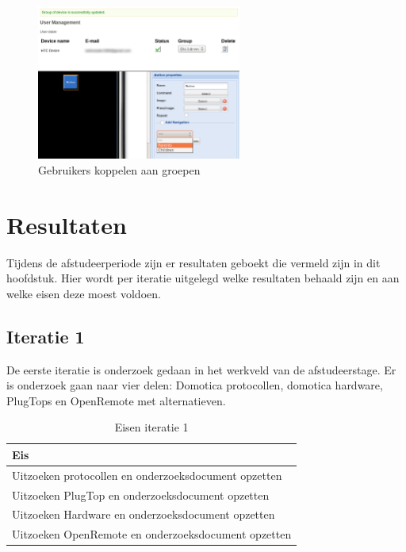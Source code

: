 \documentclass[]{article}
\begin{document}
\begin{figure}[htpb]
   \begin{center}
     \includegraphics[width=0.6\textwidth]{usergroups.pdf}
   \end{center}
   \caption{Gebruikers koppelen aan groepen}
\end{figure}

\newpage
\section{Resultaten}

Tijdens de afstudeerperiode zijn er resultaten geboekt die vermeld zijn in dit
hoofdstuk. Hier wordt per iteratie uitgelegd welke resultaten behaald
zijn en aan welke eisen deze moest voldoen.

\subsection{Iteratie 1}
De eerste iteratie is onderzoek gedaan in het werkveld van de afstudeerstage.
Er is onderzoek gaan naar vier delen: Domotica protocollen, domotica hardware,
PlugTops en OpenRemote met alternatieven. 

\begin{table}[htpb]
  \caption{Eisen iteratie 1}
  \begin{center}
    \begin{tabular}{|| l ||}\hline
        Eis                                                  \\\hline\hline
        Uitzoeken protocollen en onderzoeksdocument opzetten \\\hline
        Uitzoeken PlugTop en onderzoeksdocument opzetten     \\\hline
        Uitzoeken Hardware en onderzoeksdocument opzetten    \\\hline
        Uitzoeken OpenRemote en onderzoeksdocument opzetten  \\\hline
    \end{tabular}
  \end{center}
\end{table}
\end{document}
